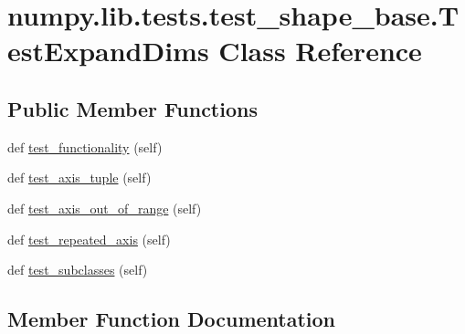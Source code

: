 \hypertarget{classnumpy_1_1lib_1_1tests_1_1test__shape__base_1_1TestExpandDims}{}\section{numpy.\+lib.\+tests.\+test\+\_\+shape\+\_\+base.\+Test\+Expand\+Dims Class Reference}
\label{classnumpy_1_1lib_1_1tests_1_1test__shape__base_1_1TestExpandDims}
\subsection*{Public Member Functions}
\begin{DoxyCompactItemize}
\item 
def \hyperlink{classnumpy_1_1lib_1_1tests_1_1test__shape__base_1_1TestExpandDims_a49040178aefe73a1715d2e574b32eb51}{test\+\_\+functionality} (self)
\item 
def \hyperlink{classnumpy_1_1lib_1_1tests_1_1test__shape__base_1_1TestExpandDims_a75255fb3e5edd2a0b09ed2e3d89f3673}{test\+\_\+axis\+\_\+tuple} (self)
\item 
def \hyperlink{classnumpy_1_1lib_1_1tests_1_1test__shape__base_1_1TestExpandDims_a9b406f1f8ed466a03f2c553ba1913261}{test\+\_\+axis\+\_\+out\+\_\+of\+\_\+range} (self)
\item 
def \hyperlink{classnumpy_1_1lib_1_1tests_1_1test__shape__base_1_1TestExpandDims_a11a831860754b34b632f45d5d87f6359}{test\+\_\+repeated\+\_\+axis} (self)
\item 
def \hyperlink{classnumpy_1_1lib_1_1tests_1_1test__shape__base_1_1TestExpandDims_a4e69200f6520b7cc0b48753d7c87ddeb}{test\+\_\+subclasses} (self)
\end{DoxyCompactItemize}


\subsection{Member Function Documentation}
\mbox{\label{classnumpy_1_1lib_1_1tests_1_1test__shape__base_1_1TestExpandDims_a9b406f1f8ed466a03f2c553ba1913261}} 
